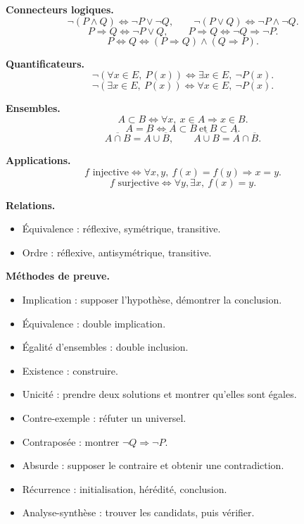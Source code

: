 \documentclass[11pt,a4paper]{article}
\newcommand{\non}{\neg}
\newcommand{\et}{\wedge}
\newcommand{\ou}{\vee}
\newcommand{\imp}{\Rightarrow}
\newcommand{\ssi}{\Longleftrightarrow}
\begin{document}
\begin{tcolorbox}[enhanced,breakable,colback=bleuclair,colframe=bleuprepa,title=\textbf{Synthèse générale}]
\textbf{Connecteurs logiques.}
\[
\non(P\et Q)\ssi\non P\ou\non Q,\qquad
\non(P\ou Q)\ssi\non P\et\non Q.
\]
\[
P\imp Q\ssi\non P\ou Q,\qquad
P\imp Q\ssi\non Q\imp\non P.
\]
\[
P\ssi Q\ssi(P\imp Q)\et(Q\imp P).
\]

\medskip

\textbf{Quantificateurs.}
\[
\non(\forall x\in E,\ P(x))\ssi\exists x\in E,\ \non P(x).
\]
\[
\non(\exists x\in E,\ P(x))\ssi\forall x\in E,\ \non P(x).
\]

\medskip

\textbf{Ensembles.}
\[
A\subset B\ssi\forall x,\ x\in A\imp x\in B.
\]
\[
A=B\ssi A\subset B\ \text{et}\ B\subset A.
\]
\[
\overline{A\cap B}=\overline A\cup\overline B,\qquad
\overline{A\cup B}=\overline A\cap\overline B.
\]

\medskip

\textbf{Applications.}
\[
f\text{ injective}\ssi \forall x,y,\ f(x)=f(y)\imp x=y.
\]
\[
f\text{ surjective}\ssi \forall y,\exists x,\ f(x)=y.
\]

\medskip

\textbf{Relations.}
\begin{itemize}
    \item Équivalence : réflexive, symétrique, transitive.
    \item Ordre : réflexive, antisymétrique, transitive.
\end{itemize}

\medskip

\textbf{Méthodes de preuve.}
\begin{itemize}
    \item Implication : supposer l'hypothèse, démontrer la conclusion.
    \item Équivalence : double implication.
    \item Égalité d'ensembles : double inclusion.
    \item Existence : construire.
    \item Unicité : prendre deux solutions et montrer qu'elles sont égales.
    \item Contre-exemple : réfuter un universel.
    \item Contraposée : montrer \(\non Q\imp\non P\).
    \item Absurde : supposer le contraire et obtenir une contradiction.
    \item Récurrence : initialisation, hérédité, conclusion.
    \item Analyse-synthèse : trouver les candidats, puis vérifier.
\end{itemize}
\end{tcolorbox}
\end{document}
